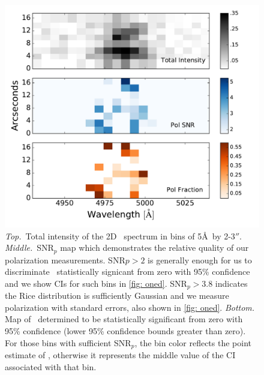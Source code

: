 \begin{figure}
\begin{center}
\includegraphics[width=5in]{Figures/lyapol/f5_v2.pdf}
\caption[2D total intensity, polarization signal-to-noise, and polarization map]{\textit{Top.}~Total intensity of the 2D \lya~spectrum in bins of 5\AA~by 2-3$''$. \textit{Middle.}~SNR$_p$ map which demonstrates the relative quality of our polarization measurements. SNR$p > 2$ is generally enough for us to discriminate \pol~statistically signicant from zero with 95\% confidence and we show CIs for such bins in \autoref{fig: oned}.  SNR$_p > 3.8$ indicates the Rice distribution is sufficiently Gaussian and we measure polarization with standard errors, also shown in \autoref{fig: oned}. \textit{Bottom.} Map of \pol~determined to be statistically significant from zero with 95\% confidence (lower 95\% confidence bounds greater than zero). For those bins with sufficient SNR$_p$, the bin color reflects the point estimate of \pol, otherwise it  represents the middle value of the CI associated with that bin.}
\label{fig: pol2d}
\end{center}
\end{figure}

